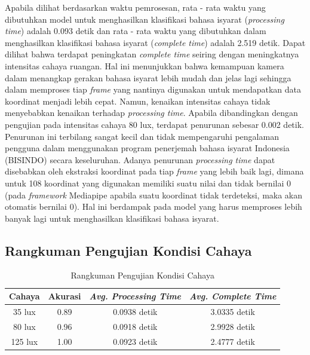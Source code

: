 Apabila dilihat berdasarkan waktu pemrosesan, rata - rata waktu yang dibutuhkan model untuk menghasilkan klasifikasi bahasa isyarat (\emph{processing time}) adalah 0.093 detik dan rata - rata waktu yang dibutuhkan dalam menghasilkan klasifikasi bahasa isyarat (\emph{complete time}) adalah 2.519 detik. Dapat dilihat bahwa terdapat peningkatan \emph{complete time} seiring dengan meningkatnya intensitas cahaya ruangan. Hal ini menunjukkan bahwa kemampuan kamera dalam menangkap gerakan bahasa isyarat lebih mudah dan jelas lagi sehingga dalam memproses tiap \emph{frame} yang nantinya digunakan untuk mendapatkan data koordinat menjadi lebih cepat. Namun, kenaikan intensitas cahaya tidak menyebabkan kenaikan terhadap \emph{processing time}. Apabila dibandingkan dengan pengujian pada intensitas cahaya 80 lux, terdapat penurunan sebesar 0.002 detik. Penurunan ini terbilang sangat kecil dan tidak mempengaruhi pengalaman pengguna dalam menggunakan program penerjemah bahasa isyarat Indonesia (BISINDO) secara keseluruhan. Adanya penurunan \emph{processing time} dapat disebabkan oleh ekstraksi koordinat pada tiap \emph{frame} yang lebih baik lagi, dimana untuk 108 koordinat yang digunakan memiliki suatu nilai dan tidak bernilai 0 (pada \emph{framework} Mediapipe apabila suatu koordinat tidak terdeteksi, maka akan otomatis bernilai 0). Hal ini berdampak pada model yang harus memproses lebih banyak lagi untuk menghasilkan klasifikasi bahasa isyarat.

\subsection{Rangkuman Pengujian Kondisi Cahaya}
\label{sec:analisisrangkumancahaya}

\begin{longtable}{|c|c|c|c|}
  \caption{Rangkuman Pengujian Kondisi Cahaya}
  \label{tb:evaluasiCahaya}                                   \\
  \hline
  \rowcolor[HTML]{C0C0C0}
  \textbf{Cahaya} & \textbf{Akurasi} & \emph{\textbf{Avg. Processing Time}} & \emph{\textbf{Avg. Complete Time}} \\
  \hline
  35 lux & 0.89 & 0.0938 detik & 3.0335 detik \\
  80 lux & 0.96 & 0.0918 detik & 2.9928 detik \\
  125 lux & 1.00 & 0.0923 detik & 2.4777 detik \\
  \hline
\end{longtable}

